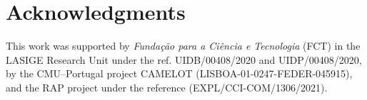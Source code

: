 \section{Acknowledgments}
\label{sec:acknowledgments}
This work was supported by \textit{Fundação para a Ciência e Tecnologia} (FCT) in the LASIGE Research Unit under the ref. UIDB/00408/2020 and UIDP/00408/2020, by the CMU--Portugal project CAMELOT (LISBOA-01-0247-FEDER-045915), and the RAP project under the reference (EXPL/CCI-COM/1306/2021).
